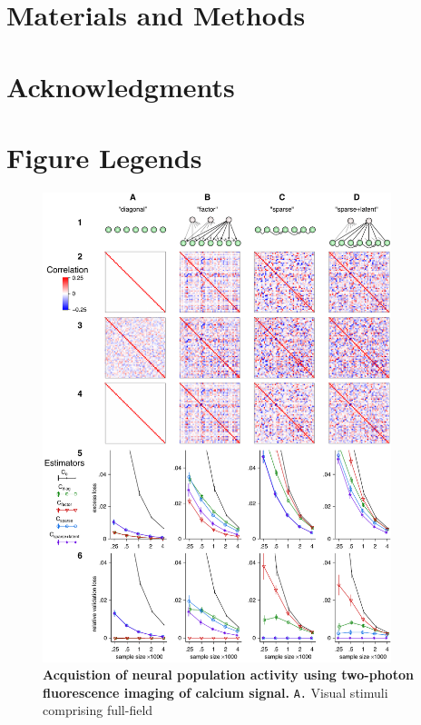 \documentclass[10pt]{article}
\begin{document}
\section*{Materials and Methods}

\section*{Acknowledgments}





\section*{Figure Legends}
\begin{figure}[!ht]
\begin{center}
\includegraphics[width=4in]{figures/Figure1.pdf}
\end{center}
\caption{
{\bf Acquistion of neural population activity using two-photon fluorescence imaging of calcium signal.}  {\tt A.} Visual stimuli comprising full-field  
}
\label{Figure_label}
\end{figure}



\end{document}

